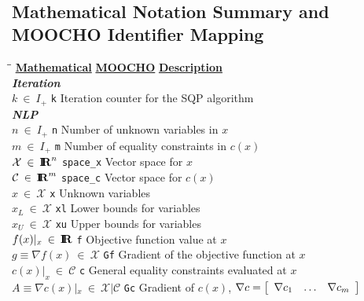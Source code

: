 {\noindent{}\\[2ex]

\pagebreak

\subsection{Mathematical Notation Summary and MOOCHO Identifier Mapping}

\begin{tabbing}
\hspace*{25ex}\=\hspace{18ex}\= \kill
\underline{\textbf{Mathematical}}
	\> \underline{\textbf{MOOCHO}}
		\> \underline{\textbf{Description}}	\\
\textbf{\textit{Iteration}} \\
$k \:\in\:I_{+}$
	\> \texttt{k}
		\> Iteration counter for the SQP algorithm \\
\textbf{\textit{NLP}} \\
$n \:\in\:I_{+}$
	\> \texttt{n}
		\> Number of unknown variables in $x$ \\
$m \:\in\:I_{+}$
	\> \texttt{m}
		\> Number of equality constraints in $c(x)$ \\
$\mathcal{X} \:\in\:\RE^n$
	\> \texttt{space\_x}
		\> Vector space for $x$ \\
$\mathcal{C} \:\in\:\RE^m$
	\> \texttt{space\_c}
		\> Vector space for $c(x)$ \\
$x \:\in\:\mathcal{X}$
	\> \texttt{x}
		\> Unknown variables \\
$x_L \:\in\:\mathcal{X}$
	\> \texttt{xl}
		\> Lower bounds for variables \\
$x_U \:\in\:\mathcal{X}$
	\> \texttt{xu}
		\> Upper bounds for variables \\
$f(x)|_x \:\in\: \RE$
	\> \texttt{f}
		\> Objective function value at $x$ \\
$g \equiv \nabla f(x) \:\in\:\mathcal{X}$
	\> \texttt{Gf}
		\> Gradient of the objective function at $x$ \\
$c(x)|_x \:\in\:\mathcal{C}$
	\> \texttt{c}
		\> General equality constraints evaluated at $x$ \\
$A \equiv \nabla c(x)|_x \:\in\:\mathcal{X}|\mathcal{C}$
	\> \texttt{Gc}
		\> Gradient of $c(x)$,
			 $\nabla c = {\bmat{ccc} \nabla c_1 & \ldots & \nabla c_m \emat}$ \\


\end{tabbing}}
